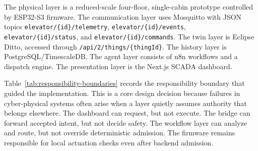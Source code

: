 \documentclass[journal]{IEEEtran}
\newcommand{\artifact}[1]{\texttt{#1}}
\newcommand{\topicbase}{\artifact{elevator/\{id\}/}}
\begin{document}
The physical layer is a reduced-scale four-floor, single-cabin prototype controlled by ESP32-S3 firmware. The communication layer uses Mosquitto with JSON topics \topicbase\artifact{telemetry}, \topicbase\artifact{events}, \topicbase\artifact{status}, and \topicbase\artifact{commands}. The twin layer is Eclipse Ditto, accessed through \artifact{/api/2/things/\{thingId\}}. The history layer is PostgreSQL/TimescaleDB. The agent layer consists of n8n workflows and a dispatch engine. The presentation layer is the Next.js SCADA dashboard.

Table~\ref{tab:responsibility-boundaries} records the responsibility boundary that guided the implementation. This is a core design decision because failures in cyber-physical systems often arise when a layer quietly assumes authority that belongs elsewhere. The dashboard can request, but not execute. The bridge can forward accepted intent, but not decide safety. The workflow layer can analyze and route, but not override deterministic admission. The firmware remains responsible for local actuation checks even after backend admission.
\end{document}
